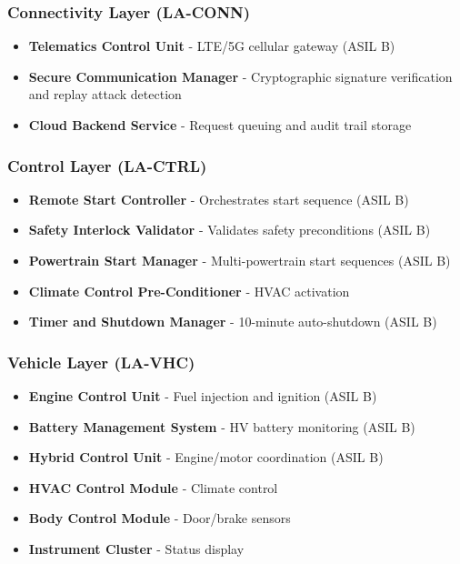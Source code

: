 \documentclass[11pt,a4paper]{article}
\begin{document}
\subsubsection{Connectivity Layer (LA-CONN)}
\begin{itemize}[leftmargin=*]
    \item \textbf{Telematics Control Unit} - LTE/5G cellular gateway (ASIL B)
    \item \textbf{Secure Communication Manager} - Cryptographic signature verification and replay attack detection
    \item \textbf{Cloud Backend Service} - Request queuing and audit trail storage
\end{itemize}

\subsubsection{Control Layer (LA-CTRL)}
\begin{itemize}[leftmargin=*]
    \item \textbf{Remote Start Controller} - Orchestrates start sequence (ASIL B)
    \item \textbf{Safety Interlock Validator} - Validates safety preconditions (ASIL B)
    \item \textbf{Powertrain Start Manager} - Multi-powertrain start sequences (ASIL B)
    \item \textbf{Climate Control Pre-Conditioner} - HVAC activation
    \item \textbf{Timer and Shutdown Manager} - 10-minute auto-shutdown (ASIL B)
\end{itemize}

\subsubsection{Vehicle Layer (LA-VHC)}
\begin{itemize}[leftmargin=*]
    \item \textbf{Engine Control Unit} - Fuel injection and ignition (ASIL B)
    \item \textbf{Battery Management System} - HV battery monitoring (ASIL B)
    \item \textbf{Hybrid Control Unit} - Engine/motor coordination (ASIL B)
    \item \textbf{HVAC Control Module} - Climate control
    \item \textbf{Body Control Module} - Door/brake sensors
    \item \textbf{Instrument Cluster} - Status display
\end{itemize}
\end{document}
